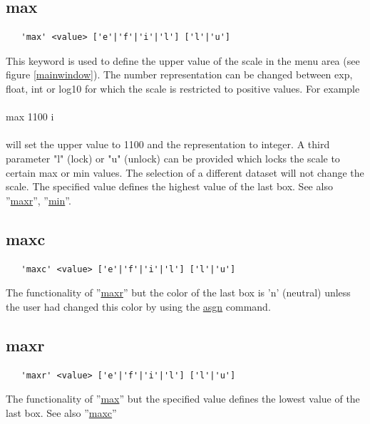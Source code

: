 \documentclass{article}
\providecommand{\htmlref}[2]{\hyperref[#2]{#1}}
\begin{document}
\subsection{\label{max}max}
\begin{verbatim}
   'max' <value> ['e'|'f'|'i'|'l'] ['l'|'u']
\end{verbatim}
This keyword is used to define the upper value of the scale in the menu area (see figure \ref{mainwindow}). The number representation can be changed between exp, float, int or log10 for which the scale is restricted to positive values. For example\\\\max 1100 i\\\\will set the upper value to 1100 and the representation to integer. A third parameter "l" (lock) or "u" (unlock) can be provided which locks the scale to certain max or min values. The selection of a different dataset will not change the scale. The specified value defines the highest value of the last box. See also ''\htmlref{maxr}{maxr}'', ''\htmlref{min}{min}''.
 
\subsection{\label{maxc}maxc}
\begin{verbatim}
   'maxc' <value> ['e'|'f'|'i'|'l'] ['l'|'u']
\end{verbatim}
The functionality of ''\htmlref{maxr}{maxr}'' but the color of the last box is 'n' (neutral) unless the user had changed this color by using the \htmlref{asgn}{asgn} command.
 
\subsection{\label{maxr}maxr}
\begin{verbatim}
   'maxr' <value> ['e'|'f'|'i'|'l'] ['l'|'u']
\end{verbatim}
The functionality of ''\htmlref{max}{max}'' but the specified value defines the lowest value of the last box. See also ''\htmlref{maxc}{maxc}''
\end{document}
